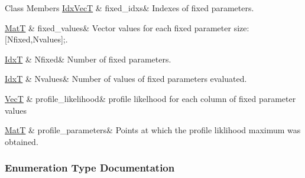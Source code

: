 \begin{DoxyFields}{Class Members}
\hyperlink{namespacemappel_ac63743dcd42180127307cd0e4ecdd784}{Idx\+VecT}\hypertarget{namespacemappel_1_1estimator_a3ed4bf975a26a6e847e33e2a0e2be6ff}{}\label{namespacemappel_1_1estimator_a3ed4bf975a26a6e847e33e2a0e2be6ff}
&
fixed\+\_\+idxs&
Indexes of fixed parameters. \\
\hline

\hyperlink{namespacemappel_a7091ab87c528041f7e2027195fad8915}{MatT}\hypertarget{namespacemappel_1_1estimator_a32fc54cfe37b35e56489e2ae395ef2c5}{}\label{namespacemappel_1_1estimator_a32fc54cfe37b35e56489e2ae395ef2c5}
&
fixed\+\_\+values&
Vector values for each fixed parameter size\+:\mbox{[}Nfixed,Nvalues\mbox{]};. \\
\hline

\hyperlink{namespacemappel_ab17ec0f30b61ece292439d7ece81d3a8}{IdxT}\hypertarget{namespacemappel_1_1estimator_a87eb5e69b82d15f2b923c7ce9b00a8f9}{}\label{namespacemappel_1_1estimator_a87eb5e69b82d15f2b923c7ce9b00a8f9}
&
Nfixed&
Number of fixed parameters. \\
\hline

\hyperlink{namespacemappel_ab17ec0f30b61ece292439d7ece81d3a8}{IdxT}\hypertarget{namespacemappel_1_1estimator_a2fb7609aa391e1f18d6afaa211709865}{}\label{namespacemappel_1_1estimator_a2fb7609aa391e1f18d6afaa211709865}
&
Nvalues&
Number of values of fixed parameters evaluated. \\
\hline

\hyperlink{namespacemappel_a2225ad69f358daa3f4f99282a35b9a3a}{VecT}\hypertarget{namespacemappel_1_1estimator_ab21589458be6326b2e5640b56b89461e}{}\label{namespacemappel_1_1estimator_ab21589458be6326b2e5640b56b89461e}
&
profile\+\_\+likelihood&
profile likelhood for each column of fixed parameter values \\
\hline

\hyperlink{namespacemappel_a7091ab87c528041f7e2027195fad8915}{MatT}\hypertarget{namespacemappel_1_1estimator_ac3e402678de2606098f6f4f7204214c3}{}\label{namespacemappel_1_1estimator_ac3e402678de2606098f6f4f7204214c3}
&
profile\+\_\+parameters&
Points at which the profile liklihood maximum was obtained. \\
\hline

\end{DoxyFields}


\subsubsection{Enumeration Type Documentation}
